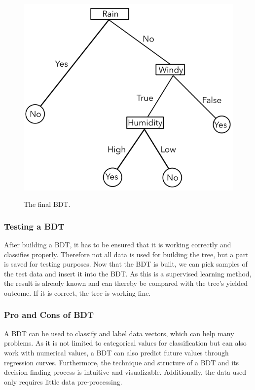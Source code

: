 \documentclass[
12pt,
headsepline,
bibliography=totoc,
twoside=semi,
fleqn
]{scrartcl}
\begin{document}
 \newpage
 \begin{figure}[H]
    \centering\includegraphics[scale=0.7]{BDT11.png}\label{fig:fig11}
    \caption{The final BDT.} 
 \end{figure}



 \subsubsection{Testing a BDT\label{sec:sec2-1-4}}
 After building a BDT, it has to be ensured that it is working correctly and classifies properly. Therefore not all data is used for building the tree, but a part is saved for testing purposes. Now that the BDT is built, we can pick samples of the test data and insert it into the BDT. As this is a supervised learning method, the result is already known and can thereby be compared with the tree's yielded outcome. If it is correct, the tree is working fine.  

 \subsubsection{Pro and Cons of BDT\label{sec:sec2-1-5}}
 A BDT can be used to classify and label data vectors, which can help many problems. As it is not limited to categorical values for classification but can also work with numerical values, a BDT can also predict future values through regression curves. Furthermore, the technique and structure of a BDT and its decision finding process is intuitive and visualizable. Additionally, the data used only requires little data pre-processing.
\end{document}
